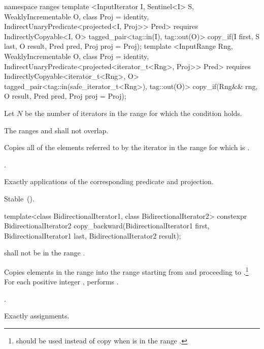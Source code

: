 \begin{addedblock}
%
\begin{itemdecl}
namespace ranges {
  template <InputIterator I, Sentinel<I> S, WeaklyIncrementable O, class Proj = identity,
            IndirectUnaryPredicate<projected<I, Proj>> Pred>
      requires IndirectlyCopyable<I, O>
    tagged_pair<tag::in(I), tag::out(O)>
      copy_if(I first, S last, O result, Pred pred, Proj proj = Proj{});
  template <InputRange Rng, WeaklyIncrementable O, class Proj = identity,
            IndirectUnaryPredicate<projected<iterator_t<Rng>, Proj>> Pred>
      requires IndirectlyCopyable<iterator_t<Rng>, O>
    tagged_pair<tag::in(safe_iterator_t<Rng>), tag::out(O)>
      copy_if(Rng&& rng, O result, Pred pred, Proj proj = Proj{});
}
\end{itemdecl}

\begin{itemdescr}
\pnum
Let $N$ be the number of iterators  in the range 
for which the condition  holds.

\pnum
\requires The ranges  and  shall not overlap.

\pnum
\effects Copies all of the elements referred to by the iterator  in the range 
for which  is .

\pnum
\returns {}.

\pnum
\complexity Exactly  applications of the corresponding predicate and projection.

\pnum
\remarks Stable~().
\end{itemdescr}
\end{addedblock}

%
\begin{itemdecl}
template<class BidirectionalIterator1, class BidirectionalIterator2>
  constexpr BidirectionalIterator2
    copy_backward(BidirectionalIterator1 first,
                  BidirectionalIterator1 last,
                  BidirectionalIterator2 result);
\end{itemdecl}

\begin{itemdescr}
\pnum
\requires
{}
shall not be in the range
.

\pnum
\effects
Copies elements in the range 
into the
range 
starting from
and proceeding to .\footnote{
should be used instead of copy when 
is in
the range
.}
For each positive integer
,
performs
.

\pnum
\returns
{}.

\pnum
\complexity
Exactly
assignments.
\end{itemdescr}

